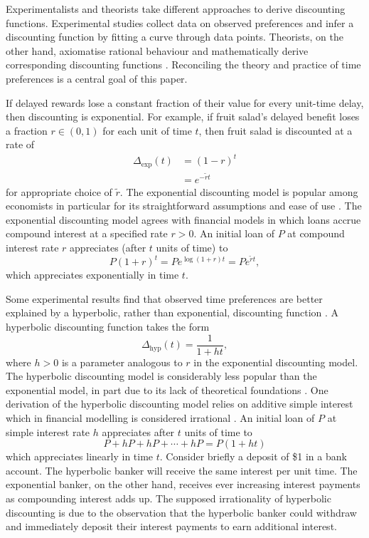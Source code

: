 \documentclass[titlepage, hidelinks, 12pt]{article}
\theoremstyle{plain}
\theoremstyle{remark}
\theoremstyle{definition}
\DeclareMathOperator{\hyp}{hyp}
\begin{document}
Experimentalists and theorists take different approaches to derive discounting functions. Experimental studies collect data on
observed preferences and infer a discounting function by fitting a curve through data points. Theorists, on the other hand, axiomatise
rational behaviour and mathematically derive corresponding discounting functions \cite{mazur85, ainslie75, green81, green04}. 
Reconciling the theory and practice of time preferences is a central goal of this paper. 


If delayed rewards lose a constant fraction of their value for every unit-time delay, then discounting is exponential. 
For example, if fruit salad's delayed benefit loses a fraction $r\in(0, 1)$ for each unit of time $t$, then
fruit salad is discounted at a rate of 
\begin{align}
    \Delta_{\exp}(t) &= (1-r)^{t} \\
    &= e^{-\tilde r t} 
    \label{eqn:exponential_discounting}
\end{align}
for appropriate choice of $\tilde r$. 
The exponential discounting model is popular among economists in particular
for its straightforward assumptions and ease of use \cite{sozou98}. 
The exponential discounting model 
agrees with financial models in which loans accrue compound interest at a specified rate $r>0$. An initial loan of $P$ at compound interest
rate $r$ appreciates (after $t$ units of time) to 
\begin{equation}
    P(1 + r)^{t} = Pe^{\log(1+r) t} = Pe^{\tilde{r}t},
    \label{eqn:compound_interest}
\end{equation}
which appreciates exponentially in time $t$. 



Some experimental results find that observed time preferences are better explained
by a hyperbolic, rather than exponential, discounting function \cite{maia09, green04, doyle12}. A hyperbolic discounting function takes
the form
\begin{equation}
    \Delta_{\hyp}(t) = \frac{1}{1+ht},
\end{equation}
where $h>0$ is a parameter analogous to $r$ in the exponential discounting model. The hyperbolic discounting model is considerably less
popular than the exponential model, in part due to its lack of theoretical foundations \cite{sozou98}. 
One derivation of the hyperbolic discounting model relies
on additive simple interest which in financial modelling is considered irrational \cite{rachlin06}. An initial loan
of $P$ at simple interest rate $h$ appreciates after $t$ units of time to
\begin{equation}
    P + hP + hP + \cdots + hP = P(1 + ht)
    \label{eqn:simple_interest}
\end{equation}
which appreciates linearly in time $t$. 
Consider briefly a deposit of \$1 in a bank account. The hyperbolic banker will receive the same interest per unit time. 
The exponential banker, on the other hand, receives ever increasing interest payments as compounding interest adds up. 
The supposed irrationality of hyperbolic discounting is due to the observation that the hyperbolic banker could withdraw and immediately
deposit their interest payments to earn additional interest. 
\end{document}
